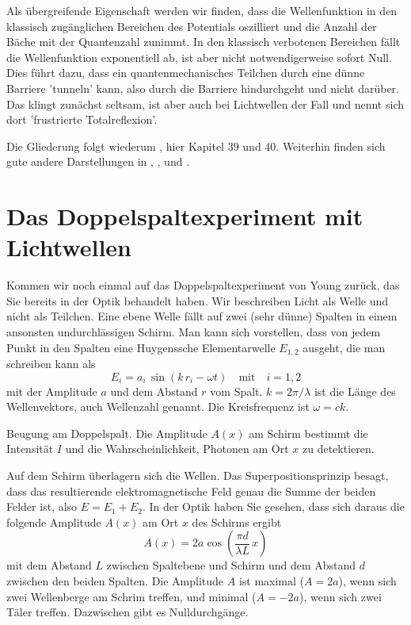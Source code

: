 Als übergreifende Eigenschaft werden wir finden, dass die Wellenfunktion in den klassisch zugänglichen Bereichen des Potentials oszilliert und die Anzahl der Bäche mit der Quantenzahl zunimmt. In den klassisch verbotenen Bereichen fällt die Wellenfunktion exponentiell ab, ist aber nicht notwendigerweise sofort Null. Dies führt dazu, dass ein quantenmechanisches Teilchen durch eine dünne Barriere 'tunneln' kann, also durch die Barriere hindurchgeht und nicht darüber. Das klingt zunächst seltsam, ist aber auch bei Lichtwellen der Fall und nennt sich dort 'frustrierte Totalreflexion'.

Die Gliederung folgt wiederum \cite{Knight_physics}, hier Kapitel 39 und 40. Weiterhin finden sich gute andere Darstellungen in \cite{Haliday_Resnick}, \cite{Demtröder_ep3}, \cite{Haken_wolf_I} und \cite{Harris_moderne_Physik}.





\section{Das Doppelspaltexperiment mit Lichtwellen}

Kommen wir noch einmal auf das Doppelspaltexperiment von Young zurück, das Sie bereits in der Optik behandelt haben. Wir beschreiben Licht als Welle und nicht als Teilchen. Eine ebene Welle fällt auf zwei (sehr dünne) Spalten in einem ansonsten undurchlässigen Schirm. Man kann sich vorstellen, dass von jedem Punkt in den Spalten eine Huygenssche Elementarwelle $E_{1,2}$ ausgeht, die man schreiben kann als 
\begin{equation}
    E_{i} = a_i \, \sin ( k \, r_i - \omega t) \quad \text{mit} \quad i = 1,2
\end{equation}
mit der Amplitude $a$ und dem Abstand $r$ vom Spalt. $k = 2 \pi / \lambda $ ist die Länge des Wellenvektors, auch Wellenzahl genannt.
Die Kreisfrequenz ist $\omega = c k$.


\begin{marginfigure}
    \caption{Beugung am Doppelspalt. Die Amplitude $A(x)$ am Schirm bestimmt die Intensität $I$ und die Wahrscheinlichkeit, Photonen am Ort $x$ zu detektieren.}
    \label{fig:3_Doppelspalt}
\end{marginfigure}


Auf dem Schirm überlagern sich die Wellen. Das Superpositionsprinzip besagt, dass das resultierende elektromagnetische Feld genau die Summe der beiden Felder ist, also $E = E_1 + E_2$. In der Optik haben Sie gesehen, dass sich daraus die folgende Amplitude $A(x)$ am Ort $x$ des Schirms ergibt
\begin{equation}
    A(x) = 2 a\cos \left( \frac{\pi d}{\lambda L} \, x \right)
\end{equation}
mit dem Abstand $L$ zwischen Spaltebene und Schirm und dem Abstand $d$ zwischen den beiden Spalten. Die Amplitude $A$ ist maximal ($A = 2a$), wenn sich zwei Wellenberge am Schrim treffen, und minimal ($A = -2 a$), wenn sich zwei Täler treffen.  Dazwischen gibt es Nulldurchgänge. 

